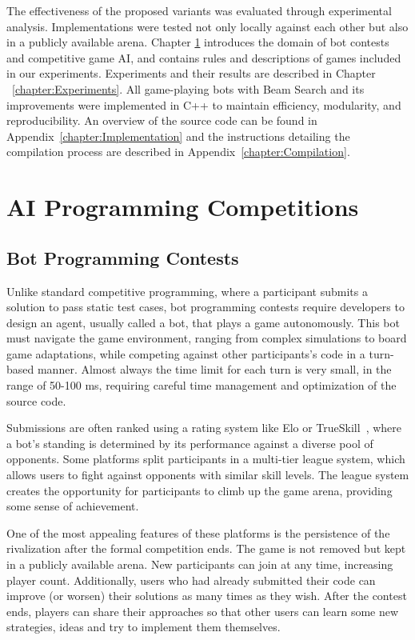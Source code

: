 \documentclass[shortabstract, mgr, english]{iithesis}
\begin{document}
The effectiveness of the proposed variants was evaluated through experimental analysis. Implementations were tested not only locally against each other but also in a publicly available arena. Chapter \ref{chapter:AIProgrammingCompetitions} introduces the domain of bot contests and competitive game AI, and  contains rules and descriptions of games included in our experiments. Experiments and their results are described in Chapter ~\ref{chapter:Experiments}. All game-playing bots with Beam Search and its improvements were implemented in C++ to maintain efficiency, modularity, and reproducibility. An overview of the source code can be found in Appendix~\ref{chapter:Implementation} and the instructions detailing the compilation process are described in Appendix~\ref{chapter:Compilation}.

\chapter{AI Programming Competitions}
\label{chapter:AIProgrammingCompetitions}

\section{Bot Programming Contests}
Unlike standard competitive programming, where a participant submits a solution to pass static test cases, bot programming contests require developers to design an agent, usually called a bot, that plays a game autonomously. This bot must navigate the game environment, ranging from complex simulations to board game adaptations, while competing against other participants's code in a turn-based manner. Almost always the time limit for each turn is very small, in the range of 50-100 ms, requiring careful time management and optimization of the source code.

Submissions are often ranked using a rating system like Elo or TrueSkill~\cite{herbrich2006trueskill}, where a bot's standing is determined by its performance against a diverse pool of opponents. Some platforms split participants in a multi-tier league system, which allows users to fight against opponents with similar skill levels. The league system creates the opportunity for participants to climb up the game arena, providing some sense of achievement.

One of the most appealing features of these platforms is the persistence of the rivalization after the formal competition ends. The game is not removed but kept in a publicly available arena. New participants can join at any time, increasing player count. Additionally, users who had already submitted their code can improve (or worsen) their solutions as many times as they wish. After the contest ends, players can share their approaches so that other users can learn some new strategies,  ideas and try to implement them themselves.
\end{document}
